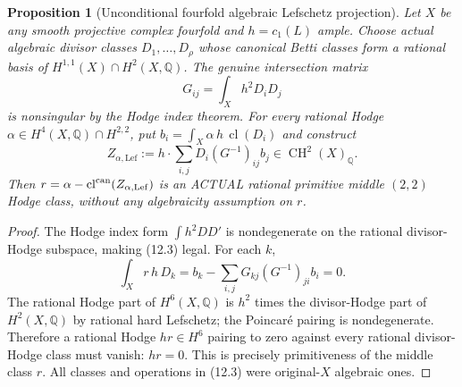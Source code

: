 \documentclass[11pt]{article}
\newcommand{\Q}{\mathbb Q}
\newcommand{\CH}{\operatorname{CH}}
\newcommand{\cl}{\operatorname{cl}}
\newtheorem{proposition}[theorem]{Proposition}
\begin{document}
\begin{proposition}[Unconditional fourfold algebraic Lefschetz projection]
Let \(X\) be any smooth projective complex fourfold
and \(h=c_1(L)\) ample. Choose actual algebraic
divisor classes \(D_1,\ldots,D_\rho\) whose
canonical Betti classes form a rational basis
of \(H^{1,1}(X)\cap H^2(X,\Q)\).
The genuine intersection matrix
\[
 G_{ij}=\int_X h^2D_iD_j                       \tag{12.2}
\]
is nonsingular by the Hodge index theorem.
For every rational Hodge \(\alpha\in H^4(X,\Q)\cap H^{2,2}\),
put \(b_i=\int_X\alpha\,h\,\cl(D_i)\) and construct
\[
 \boxed{
 Z_{\alpha,\mathrm{Lef}}
      :=h\cdot\sum_{i,j}D_i(G^{-1})_{ij}b_j
          \in\CH^2(X)_\Q.}                         \tag{12.3}
\]
Then \(r=\alpha-\cl^{\rm can}
(Z_{\alpha,\mathrm{Lef}})\) is an ACTUAL
rational primitive middle \((2,2)\) Hodge
class, \emph{without any algebraicity assumption on \(r\)}.
\end{proposition}
\begin{proof}
The Hodge index form \(\int h^2DD'\) is
nondegenerate on the rational divisor-Hodge
subspace, making (12.3) legal.
For each \(k\),
\[
 \int_Xr\,h\,D_k
   =b_k-\sum_{i,j}G_{kj}(G^{-1})_{ji}b_i=0.
\]
The rational Hodge part of \(H^6(X,\Q)\)
is \(h^2\) times the divisor-Hodge part of \(H^2(X,\Q)\)
by rational hard Lefschetz; the Poincar\'e
pairing is nondegenerate.
Therefore a rational Hodge \(h r\in H^6\)
pairing to zero against every rational
divisor-Hodge class must vanish:
\(h r=0\). This is precisely primitiveness
of the middle class \(r\).
All classes and operations in (12.3)
were original-\(X\) algebraic ones.
\end{proof}
\end{document}
